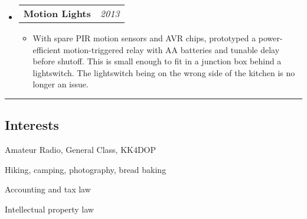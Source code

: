 \documentclass[10pt,letterpaper]{article}
\makeatletter
\newcommand{\headerrow}[2]
{\begin{tabular*}{\linewidth}{l@{\extracolsep{\fill}}r}
	#1 & #2 \\
\end{tabular*}}
\makeatother
\begin{document}
\begin{itemize}
        \item \headerrow{\textbf{Motion Lights}}{\emph{2013}}
        \begin{itemize}
            \item With spare PIR motion sensors and AVR chips, prototyped a
                power-efficient motion-triggered relay with AA batteries and
                tunable delay before shutoff.  This is small enough to fit in a
                junction box behind a lightswitch.  The lightswitch being on
                the wrong side of the kitchen is no longer an issue.
        \end{itemize}
    \end{itemize}

\hrule
\vspace{-0.4em}
\subsection*{Interests}
\begin{itemize*}
    \item Amateur Radio, General Class, KK4DOP
    \item Hiking, camping, photography, bread baking
    \item Accounting and tax law
    \item Intellectual property law
\end{itemize*}
\end{document}
